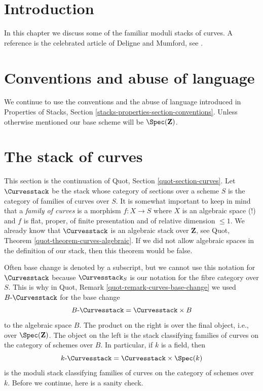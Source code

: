 \section{Introduction}
\label{moduli-curves-section-introduction}
In this chapter we discuss some of the familiar moduli stacks of curves.
A reference is the celebrated article of Deligne and Mumford, see \cite{DM}.

\section{Conventions and abuse of language}
\label{moduli-curves-section-conventions}
We continue to use the conventions and the abuse of language
introduced in
Properties of Stacks, Section \ref{stacks-properties-section-conventions}.
Unless otherwise mentioned our base scheme will be $\Spec(\mathbf{Z})$.

\section{The stack of curves}
\label{moduli-curves-section-stack-curves}
This section is the continuation of Quot, Section \ref{quot-section-curves}.
Let $\Curvesstack$ be the stack whose category of sections over a
scheme $S$ is the category of families of curves over $S$.
It is somewhat important to keep in mind that a
{\it family of curves} is a morphism $f : X \to S$ where $X$
is an algebraic space (!) and $f$ is flat, proper, of finite presentation
and of relative dimension $\leq 1$.
We already know that $\Curvesstack$ is an
algebraic stack over $\mathbf{Z}$, see Quot, Theorem
\ref{quot-theorem-curves-algebraic}.
If we did not allow algebraic spaces in the definition of
our stack, then this theorem would be false.

\medskip\noindent
Often base change is denoted by a subscript, but we cannot use
this notation for $\Curvesstack$ because $\Curvesstack_S$
is our notation for the fibre category over $S$.
This is why in Quot, Remark \ref{quot-remark-curves-base-change}
we used $B\text{-}\Curvesstack$ for the base change
$$
B\text{-}\Curvesstack = \Curvesstack \times B
$$
to the algebraic space $B$. The product on the right is over the
final object, i.e., over $\Spec(\mathbf{Z})$. The object on the left
is the stack classifying families of curves on the category of schemes
over $B$. In particular, if $k$ is a field, then
$$
k\text{-}\Curvesstack = \Curvesstack \times \Spec(k)
$$
is the moduli stack classifying families of curves on the category
of schemes over $k$.
Before we continue, here is a sanity check.

